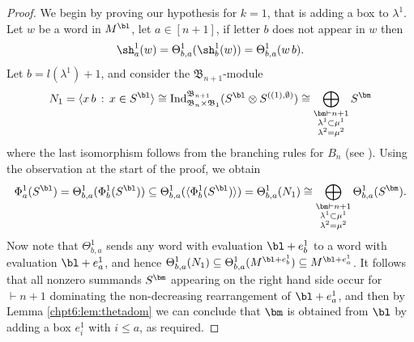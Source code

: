 \documentclass[11pt]{report}
\begin{document}
\begin{proof}
	We begin by proving our hypothesis for $k=1$, that is adding a box to $\lambda^{1}$.
	Let $w$ be a word in $M^{\bl}$, let $a \in [n+1]$, 
	if letter $b$ does not appear in $w$ then
	\[\sh_{a}^{1}(w) = \Theta_{b,a}^{1} (\sh_{b}^{1}(w)) = \Theta_{b,a}^{1}(w \,b).\]
	Let $b = l(\lambda^{1})+1$, and consider the $\mathfrak{B}_{n+1}$-module 
	\[N_{1} = \langle x \, b \, : \, x \in S^{\bl} 
	\rangle 
	\cong 
	\textnormal{Ind}_{\mathfrak{B}_{n} \times 
		\mathfrak{B}_{1}}^{\mathfrak{B}_{n+1}} ( S^{\bl} \otimes 
	S^{((1),\emptyset)}) \cong \bigoplus_{\substack{\bm \vdash n+1 \\ \lambda^{1} \subset \mu^{1} \\\lambda^{2} = \mu^{2}  }} S^{\bm}\]
	where the last isomorphism follows from the branching rules for $B_{n}$ (see \cite[Theorem III.2]{geissinger1978representations}).	
	Using the observation at the start of the proof, we obtain
	\[\Phi_{a}^{1}(S^{\bl}) = 
	\Theta_{b,a}^{1}(\Phi_{b}^{1}(S^{\bl})) 
	\subseteq \Theta_{b,a}^{1}(\langle\Phi_{b}^{1}(S^{\bl})\rangle ) 
	= 
	\Theta_{b,a}^{1}(N_{1}) \cong \bigoplus_{\substack{\bm \vdash n+1 \\ \lambda^{1} \subset \mu^{1} \\\lambda^{2} = \mu^{2}  }} \Theta_{b,a}^{1} (S^{\bm}).\]
	Now note that $\Theta_{b,a}^{1}$ sends any word with evaluation 
	$\bl+e_b^{1}$ to a word with evaluation $\bl+e_a^{1}$, and hence
	$\Theta_{b,a}^{1}(N_{1}) \subseteq\Theta_{b,a}^{1}(M^{\bl +e_{b}^{1}}) \subseteq M^{\bl +e_{a}^{1}}$. 
	It follows that all nonzero summands $S^{\bm}$ appearing on the right 
	hand side occur for $\bm\vdash n+1$ dominating the non-decreasing rearrangement of $\bl+e_a^{1}$, and then
	by Lemma \ref{chpt6:lem:thetadom} we can conclude that $\bm$ is obtained from 
	$\bl$ by adding a box $e_{i}^{1}$ with $i \leq a$, as required.
	
	
	
	
	
	
	
	
	
	
	
	
	
	
	
	
	
	
	
	
	

\end{proof}
\end{document}
